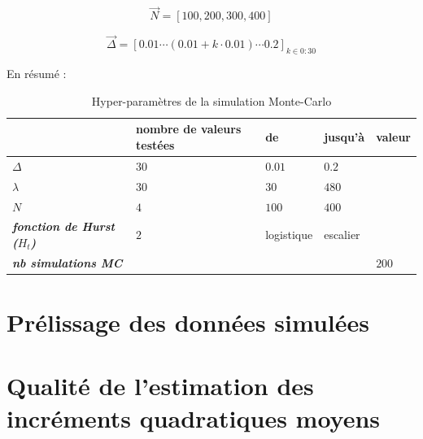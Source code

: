 $$
\vec N = [ 100, 200, 300, 400]
$$

$$
\vec \Delta = [ 0.01 \cdots (0.01 + k\cdot0.01)\cdots 0.2 ]_{k \in 0:30}
$$

En résumé :

\begin{table}[H]
    \centering
    \begin{tabular}{l|l|ll|l|}
    \cline{2-5}
    \textbf{}                                                         & \textbf{nombre de valeurs testées} & \multicolumn{1}{l|}{\textbf{de}} & \textbf{jusqu'à}         & \textbf{valeur}          \\ \hline
    \multicolumn{1}{|l|}{\textit{\textbf{$\Delta$}}}                  & $30$                               & $0.01$                        & $0.2$                   & \cellcolor[HTML]{C0C0C0} \\
    \multicolumn{1}{|l|}{\textit{\textbf{$\lambda$}}}                 & $30$                               & $30$                             & $480$                    & \cellcolor[HTML]{C0C0C0} \\
    \multicolumn{1}{|l|}{\textit{\textbf{$N$}}}                       & $4$                                & $100$                            & $400$                    & \cellcolor[HTML]{C0C0C0} \\
    \multicolumn{1}{|l|}{\textit{\textbf{fonction de Hurst ($H_t$)}}} & $2$                                & logistique                       & escalier                 & \cellcolor[HTML]{C0C0C0} \\
    \multicolumn{1}{|l|}{\textit{\textbf{nb simulations MC}}}         & \cellcolor[HTML]{C0C0C0}           & \cellcolor[HTML]{C0C0C0}         & \cellcolor[HTML]{C0C0C0} & $200$                    \\ \hline
    \end{tabular}
    \caption{Hyper-paramètres de la simulation Monte-Carlo}
    \label{tab:hyperparam-mc}
    \end{table}


\section{Prélissage des données simulées}




\section{Qualité de l'estimation des incréments quadratiques moyens}

